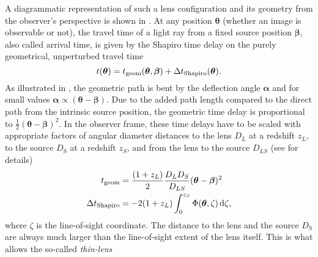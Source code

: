 A diagrammatic representation of such a lens configuration and its geometry from
the observer's perspective is shown in .  At any position
$\bm\theta$ (whether an image is observable or not), the travel time of a light
ray from a fixed source position $\bm\beta$, also called arrival time, is given
by the Shapiro time delay on the purely geometrical, unperturbed travel time
%
\begin{equation}\eqlbl{delay_components}%
  t(\bm\theta) = t_{\text{geom}}(\bm\theta, \bm\beta)
  + \Delta t_{\text{Shapiro}}(\bm\theta).
\end{equation}%
%
As illustrated in , the geometric path is bent by the
deflection angle $\bm\alpha$ and for small values $\bm\alpha\propto(\bm\theta -
\bm\beta)$. Due to the added path length compared to the direct path from the
intrinsic source position, the geometric time delay is proportional to
$\frac{1}{2}(\bm\theta - \bm\beta)^{2}$.  In the observer frame, these time
delays have to be scaled with appropriate factors of angular diameter distances
to the lens $D_{L}$ at a redshift $z_{L}$, to the source $D_\mathrm{S}$ at a
redshift $z_{S}$, and from the lens to the source $D_{LS}$ (see
 for details)
%
%
\begin{equation}\eqlbl{geo_and_shapiro}%
  \begin{aligned}%
    t_{\text{geom}} &= \frac{(1+z_{L})}{2}\frac{D_{L}D_{S}}{D_{LS}}(\bm\theta - \bm\beta)^{2} \\
    \Delta t_{\text{Shapiro}} &= -2(1+z_{L})\int_{0}^{z_{S}}\Phi(\bm\theta, \zeta)\,\mathrm{d}\zeta,
  \end{aligned}%
\end{equation}%
%
where $\zeta$ is the line-of-sight coordinate.  The distance to the lens and the
source $D_\mathrm{S}$ are always much larger than the line-of-sight extent of
the lens itself. This is what allows the so-called \textit{thin-lens}
